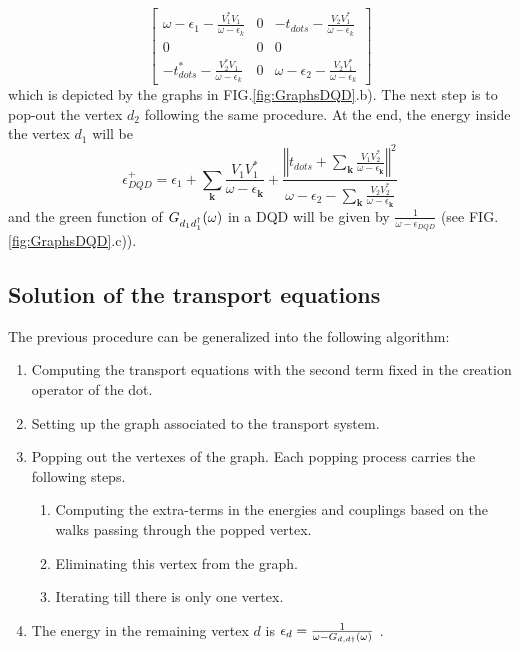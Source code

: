 \documentclass[showpacs,aps,prb,reprint,superscriptaddress]{revtex4-1}
\begin{document}




\begin{equation}
        \left[\begin{array}{ccc}
    \omega-\epsilon_{1}-\frac{V_{1}^{*}V_{1}}{\omega-\epsilon_{k}} & 0 & -t_{dots}-\frac{V_{2}V_{1}^{*}}{\omega-\epsilon_{k}}\\
    0 & 0 & 0\\
    -t_{dots}^{*}-\frac{V_{2}^{*}V_{1}}{\omega-\epsilon_{k}} & 0 & \omega-\epsilon_{2}-\frac{V_{2}V_{1}^{*}}{\omega-\epsilon_{k}}
    \end{array}\right]
\end{equation}
\noindent which is depicted by the graphs in FIG.\ref{fig:GraphsDQD}.b). The next step is to pop-out the vertex $d_2$ following the same procedure. At the end, the energy inside the vertex $d_1$ will be
\begin{equation}
    \epsilon^+_{DQD}=\epsilon_{1}+\sum_{\mathbf{k}}\frac{V_{1}V_{1}^{*}}{\omega-\epsilon_{\mathbf{k}}}+\frac{\left\Vert t_{dots}+\sum_{\mathbf{k}}\frac{V_{1}V_{2}^{*}}{\omega-\epsilon_{\mathbf{k}}}\right\Vert ^{2}}{\omega-\epsilon_{2}-\sum_{\mathbf{k}}\frac{V_{2}V_{2}^{*}}{\omega-\epsilon_{\mathbf{k}}}} \label{eq:EnDQD}
\end{equation}
and the green function of $G_{d_1d^\dagger_1}(\omega)$ in a DQD will be given by $\frac{1}{\omega -  \epsilon_{DQD}}$ (see FIG.\ref{fig:GraphsDQD}.c)).

\subsection{Solution of the transport equations}

The previous procedure can be generalized into the following algorithm:

\begin{enumerate}
    \item Computing the transport equations with the second term fixed in the creation operator of the dot.
     \item  Setting up the  graph associated to the transport system.
    \item Popping out the vertexes of the graph. Each popping process carries the following steps.
    \begin{enumerate}
        \item Computing the extra-terms in the energies and couplings based on the walks passing through the popped vertex.
        \item Eliminating this vertex from the graph. 
        \item Iterating till there is only one  vertex.
        \end{enumerate}
    \item The energy in the remaining vertex $d$ is $\epsilon_d = \frac{1}{\omega -G_{d,d\dagger}(\omega)}$ .
\end{enumerate}
  
\end{document}
